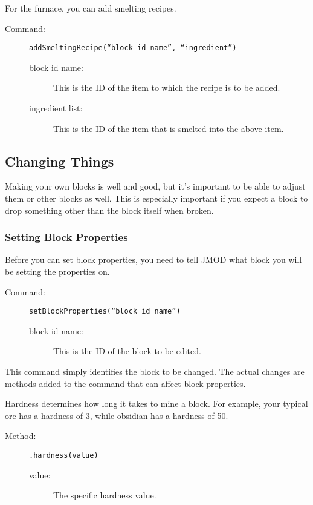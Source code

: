\documentclass[letterpaper,titlepage,12pt]{article}
\begin{document}
\newpage

For the furnace, you can add smelting recipes.

\begin{description}
\item[Command:] \texttt{addSmeltingRecipe(``block id name'', ``ingredient'')}
\begin{description}
\item [block id name:] This is the ID of the item to which the recipe is to be added.
\item [ingredient list:] This is the ID of the item that is smelted into the above item.
\end{description}
\end{description}

\subsection{Changing Things}

Making your own blocks is well and good, but it's important to be able to adjust them or other blocks as well.  This is especially important if you expect a block to drop something other than the block itself when broken.

\subsubsection{Setting Block Properties}

Before you can set block properties, you need to tell JMOD what block you will be setting the properties on.

\begin{description}
\item[Command:] \texttt{setBlockProperties(``block id name'')}
\begin{description}
\item [block id name:] This is the ID of the block to be edited.
\end{description}
\end{description}

This command simply identifies the block to be changed.  The actual changes are methods added to the command that can affect block properties.

Hardness determines how long it takes to mine a block.  For example, your typical ore has a hardness of 3, while obsidian has a hardness of 50.

\begin{description}
\item[Method:] \texttt{.hardness(value)}
\begin{description}
\item [value:] The specific hardness value.
\end{description}
\end{description}
\end{document}
